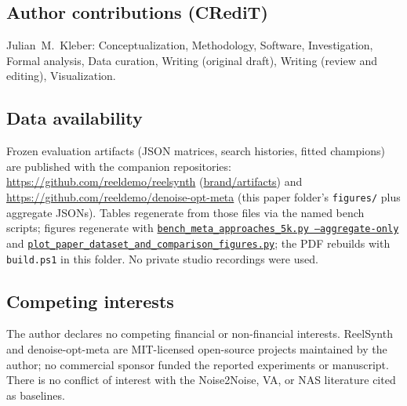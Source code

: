 \subsection{Author contributions (CRediT)}
\label{sec:credit}
Julian~M.~Kleber: Conceptualization, Methodology, Software, Investigation, Formal analysis, Data curation, Writing (original draft), Writing (review and editing), Visualization.

\subsection{Data availability}
\label{sec:data-availability}
Frozen evaluation artifacts (JSON matrices, search histories, fitted champions) are published with the companion repositories:
\url{https://github.com/reeldemo/reelsynth}
(\href{https://github.com/reeldemo/reelsynth/tree/main/brand/artifacts}{brand/artifacts})
and
\url{https://github.com/reeldemo/denoise-opt-meta}
(this paper folder's \texttt{figures/} plus aggregate JSONs).
Tables regenerate from those files via the named bench scripts;
figures regenerate with
\href{https://github.com/reeldemo/reelsynth/blob/main/scripts/bench_meta_approaches_5k.py}{\texttt{bench\_meta\_approaches\_5k.py --aggregate-only}}
and
\href{https://github.com/reeldemo/reelsynth/blob/main/scripts/plot_paper_dataset_and_comparison_figures.py}{\texttt{plot\_paper\_dataset\_and\_comparison\_figures.py}};
the PDF rebuilds with \texttt{build.ps1} in this folder.
No private studio recordings were used.

\subsection{Competing interests}
\label{sec:competing}
The author declares no competing financial or non-financial interests.
ReelSynth and denoise-opt-meta are MIT-licensed open-source projects maintained by the author; no commercial sponsor funded the reported experiments or manuscript.
There is no conflict of interest with the Noise2Noise, VA, or NAS literature cited as baselines.
